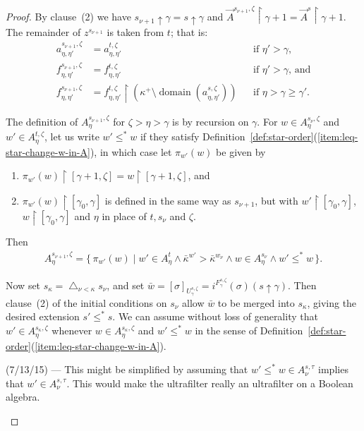 \documentclass[
twoside,
]{article}
\theoremstyle{definition}
\theoremstyle{remark}
\newcommand{\forceKappa}{\bar\kappa} %
\newcommand{\scutdown}{{\uparrow}}
\newcommand{\set}[1]{\{\,#1\,\}}
\newcommand{\restrict}{{\upharpoonright}}
\DeclareMathOperator{\domain}{domain}
\begin{document}
\begin{proof}{}
  By clause~(2) we have $s_{\nu+1}\scutdown\gamma=s\scutdown\gamma$ and
  $\vec A^{s_{\nu+1},\zeta}\restrict\gamma+1=\vec A^{s}\restrict\gamma+1$.
  The remainder of $z^{s_{\nu+1}}$ is taken from $t$; that is:
  \begin{align*}
    a^{s_{\nu+1},\zeta}_{\eta,\eta'}&=a^{t,\zeta}_{\eta,\eta'}&&\text{if
                                                     $\eta'>\gamma$,}\\
    f^{s_{\nu+1},\zeta}_{\eta,\eta'}&=f^{t,\zeta}_{\eta,\eta'}&&\text{if
                                                                 $\eta'>\gamma$,
                                                           and}\\
    f^{s_{\nu+1},\zeta}_{\eta,\eta'}&=f^{t,\zeta}_{\eta,\eta'}\restrict(\kappa^{+}\setminus\domain(a^{s,\zeta}_{\eta,\eta'}))&&\text{if $\eta>\gamma\geq\gamma'$.} 
      \end{align*}

  The definition of $A_{\eta} ^{s_{\nu+1},\zeta}$ for
  $\zeta>\eta>\gamma$ is by recursion on $\gamma$.  For $w\in
  A^{s_\nu,\zeta}_{\eta}$ and $w'\in A^{t,\zeta}_{\eta}$, let us  write $w'\leq^* w$ if
  they satisfy
  Definition~\ref{def:star-order}(\ref{item:leq-star-change-w-in-A}),
  in which case  let $\pi_{w'}(w)$ be given by
  \begin{enumerate}
  \item
    $\pi_{w'}(w)\restrict[\gamma+1,\zeta]=w\restrict[\gamma+1,\zeta]$,
    and 
  \item 
    $\pi_{w'}(w)\restrict[\gamma_0,\gamma]$ is defined 
    in the same way as  $s_{\nu+1}$, but with  $w'\restrict[\gamma_0,\gamma]$, $w\restrict[\gamma_0,\gamma]$ and $\eta$ in
    place of  $t,s_{\nu}$ and  $\zeta$. 
  \end{enumerate}
  Then
  \begin{multline*}
    A_{\eta}^{s_{\nu+1},\zeta}=\set{\pi_{w'}(w)\mid 
      w'\in  A^{t}_{\eta}\land 
      \forceKappa^{w'}>\forceKappa^{w_\nu}\land
      w\in A^{s_\nu}_{\eta}
      \land w'\leq^* w}.
  \end{multline*}
  \medskip

  
  Now set $s_{\kappa}=\bigtriangleup_{\nu<\kappa}s_{\nu}$,  and set
  $\bar w   =[\sigma ]_{U^{s,\zeta}_{\gamma}}= 
  i^{F^{s,\zeta}_{\gamma}}(\sigma)(s\scutdown\gamma)$.
  Then clause~(2) of the initial conditions on $s_{\nu}$ allow $\bar
  w$ to be merged into $s_{\kappa}$, giving the desired extension
  $s'\leq^*s$.   We can assume without loss of generality that
  $w'\in A^{s_\kappa,\zeta}_{\eta}$ whenever $w\in A^{s_\kappa,\zeta}_{\eta}$ and $w'\leq^*w$ in the
  sense of Definition~\ref{def:star-order}(\ref{item:leq-star-change-w-in-A}).
  \begin{todoenv}
    (7/13/15) --- This might be simplified by assuming that $w'\leq^*
    w\in A^{s,\tau}_{\nu}$ implies that $w'\in A^{s,\tau}_{\nu}$.
    This would make the ultrafilter really an ultrafilter on a Boolean algebra.
  \end{todoenv}


\end{proof}
\end{document}
